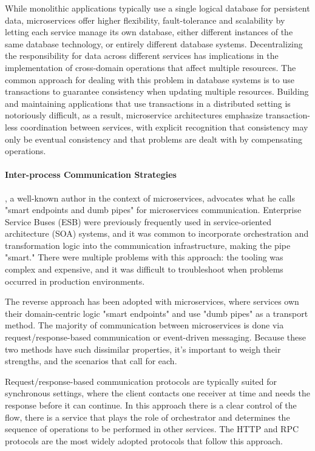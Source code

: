 While monolithic applications typically use a single logical database for persistent data,
microservices offer higher flexibility, fault-tolerance and scalability by letting each service manage its own database, either different instances of the same database technology,
or entirely different database systems.
Decentralizing the responsibility for data across different services has implications in the implementation of cross-domain operations that affect multiple resources.
The common approach for dealing with this problem in database systems is to use transactions to guarantee consistency when updating multiple resources.
Building and maintaining applications that use transactions in a distributed setting is notoriously difficult,
as a result, microservice architectures emphasize transaction-less coordination between services,
with explicit recognition that consistency may only be eventual consistency and that problems are dealt with by compensating operations.


\paragraph{Inter-process Communication Strategies}

\citeauthor{microservices}, a well-known author in the context of microservices, advocates what he calls "smart endpoints and dumb pipes" for microservices communication.
Enterprise Service Buses (ESB) were previously frequently used in service-oriented architecture (SOA) systems,
and it was common to incorporate orchestration and transformation logic into the communication infrastructure,
making the pipe "smart." There were multiple problems with this approach:
the tooling was complex and expensive, and it was difficult to troubleshoot when problems occurred in production environments.

The reverse approach has been adopted with microservices,
where services own their domain-centric logic "smart endpoints" and use "dumb pipes" as a transport method.
The majority of communication between microservices is done via request/response-based communication or event-driven messaging.
Because these two methods have such dissimilar properties, it's important to weigh their strengths, and the scenarios that call for each.

Request/response-based communication protocols are typically suited for synchronous settings,
where the client contacts one receiver at time and needs the response before it can continue.
In this approach there is a clear control of the flow,
there is a service that plays the role of orchestrator and determines the sequence of operations to be performed in other services.
The HTTP and RPC protocols are the most widely adopted protocols that follow this approach.

